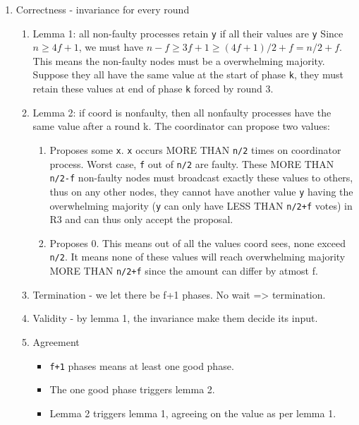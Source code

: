 \documentclass[11pt]{article}
\begin{document}
\begin{enumerate}
\begin{enumerate}
        \end{enumerate}
  \item Correctness - invariance for every round
        \label{sec:orge902a7a}
        \begin{enumerate}
          \item Lemma 1: all non-faulty processes retain \texttt{y} if all their values are \texttt{y}
                \label{sec:orgc4d10a8}
                Since \(n \ge 4f+1\), we must have \(n-f \ge 3f+1 \ge (4f + 1)/2 + f = n/2 + f\).
                This means the non-faulty nodes must be a overwhelming majority. Suppose they
                all have the same value at the start of phase \texttt{k}, they must retain these values
                at end of phase \texttt{k} forced by round 3.
          \item Lemma 2: if coord is nonfaulty, then all nonfaulty processes have the same value after a round k.
                \label{sec:orgec8b153}
                The coordinator can propose two values:
                \begin{enumerate}
                  \item Proposes some \texttt{x}. \texttt{x} occurs MORE THAN \texttt{n/2} times on coordinator process.
                        Worst case, \texttt{f} out of \texttt{n/2} are faulty. These MORE THAN \texttt{n/2-f} non-faulty
                        nodes must broadcast exactly these values to others, thus on any other nodes,
                        they cannot have another value \texttt{y} having the overwhelming majority (\texttt{y} can
                        only have LESS THAN \texttt{n/2+f} votes) in R3 and can thus only accept the
                        proposal.
                  \item Proposes 0. This means out of all the values coord sees, none exceed \texttt{n/2}.
                        It means none of these values will reach overwhelming majority MORE THAN
                        \texttt{n/2+f} since the amount can differ by atmost f.
                \end{enumerate}
          \item Termination - we let there be f+1 phases. No wait => termination.
                \label{sec:orgf61872d}
          \item Validity - by lemma 1, the invariance make them decide its input.
                \label{sec:org9adb32d}
          \item Agreement
                \label{sec:org3ac6d38}
                \begin{itemize}
                  \item \texttt{f+1} phases means at least one good phase.
                  \item The one good phase triggers lemma 2.
                  \item Lemma 2 triggers lemma 1, agreeing on the value as per lemma 1.
                \end{itemize}
        \end{enumerate}
\end{enumerate}
\end{document}
